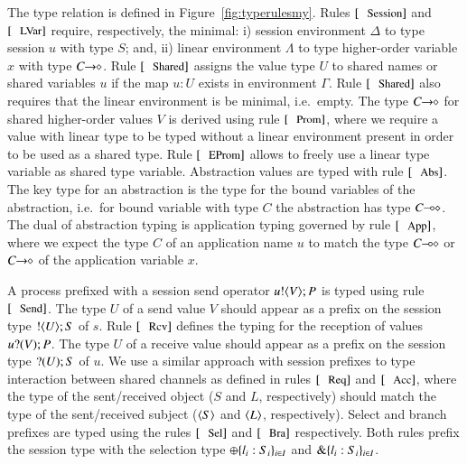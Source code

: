 

The type relation is defined in Figure~\ref{fig:typerulesmy}.
Rules $\trule{Session}$ and $\trule{LVar}$ require,
respectively, the minimal:
i) session environment $\Delta$ to type session 
$u$ with type $S$; and,
ii) linear environment $\Lambda$ to type 
higher-order variable $x$ with type $C\!\! \rightarrow\!\! \diamond$.
Rule $\trule{Shared}$
assigns the value type $U$
to shared names or shared variables $u$ 
if the map $u:U$ exists in environment
$\Gamma$. Rule $\trule{Shared}$ also requires 
that the linear environment is
be minimal, i.e.~empty.
The type $C\!\! \rightarrow\!\! \diamond$ for shared higher-order values $V$
is derived using rule $\trule{Prom}$, where we require
a value with linear type to be typed without a linear
environment present in order to be used as a shared type.
Rule $\trule{EProm}$ allows to freely use a linear
type variable as shared type variable. 
Abstraction values are typed with rule $\trule{Abs}$.
The key type for an abstraction is the type for
the bound variables of the abstraction, i.e.~for
bound variable with type $C$ the abstraction
has type $C\!\! \multimap\!\! \diamond$.
The dual of abstraction typing is application typing
governed by rule $\trule{App}$, where we expect
the type $C$ of an application name $u$ 
to match the type $C\!\! \multimap\!\! \diamond$ or $C\!\! \rightarrow\!\! \diamond$
of the application variable $x$.

A process prefixed with a session send operator $u ! \langle V \rangle ; P$
is typed using rule $\trule{Send}$.
The type $U$ of a send value $V$ should appear as a prefix
on the session type $! \langle U \rangle ; S$ of $s$.
Rule $\trule{Rcv}$
defines the typing for the 
reception of values $u ? (V) ; P$.
The type $U$ of a receive value should 
appear as a prefix on the session type $? (U) ; S$ of $u$.
We use a similar approach with session prefixes
to type interaction between shared channels as defined 
in rules $\trule{Req}$ and $\trule{Acc}$,
where the type of the sent/received object 
($S$ and $L$, respectively) should
match the type of the sent/received subject
($\langle S \rangle$ and $\langle L \rangle$, respectively).
Select and branch prefixes are typed using the rules
$\trule{Sel}$ and $\trule{Bra}$ respectively. Both
rules prefix the session type with the selection
type $\oplus \{l_i: S_i\}_{i \in I}$ and
$\& \{l_i:S_i\}_{i \in I}$.

